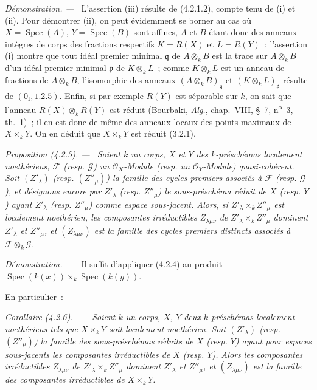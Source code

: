 \documentclass[10pt,oneside]{book}
\newenvironment{proposition}[1][]{%
  \par\medskip\noindent\itshape Proposition (#1). ---\ }{\par}
\newenvironment{corollary}[1][]{%
  \par\medskip\noindent\itshape Corollaire (#1). ---\ }{\par}
\newenvironment{proof}{%
  \par\medskip\noindent\textit{Démonstration. ---\ }}{\par}
\begin{document}
\begin{proof}
L'assertion (iii) résulte de (4.2.1.2), compte tenu de (i) et (ii). Pour
démontrer (ii), on peut évidemment se borner au cas où
$X=\operatorname{Spec}(A)$, $Y=\operatorname{Spec}(B)$ sont affines, $A$ et
$B$ étant donc des anneaux intègres de corps des fractions respectifs
$K=R(X)$ et $L=R(Y)$~; l'assertion (i) montre que tout idéal premier minimal
$\mathfrak q$ de $A\otimes_k B$ est la trace sur $A\otimes_k B$ d'un idéal
premier minimal $\mathfrak p$ de $K\otimes_k L$~; comme $K\otimes_k L$ est un
anneau de fractions de $A\otimes_k B$, l'isomorphie des anneaux
$(A\otimes_k B)_{\mathfrak q}$ et $(K\otimes_k L)_{\mathfrak p}$ résulte de
$(0_{\mathrm I},1.2.5)$. Enfin, si par exemple $R(Y)$ est séparable sur $k$,
on sait que l'anneau $R(X)\otimes_k R(Y)$ est réduit (Bourbaki,
\emph{Alg.}, chap.~VIII, \S~7, n\textsuperscript{o}~3, th.~1)~; il en est donc
de même des anneaux locaux des points maximaux de $X\times_k Y$. On en déduit
que $X\times_k Y$ est réduit (3.2.1).
\end{proof}

\begin{proposition}[4.2.5]
\label{IV.2.4.2.5-fr}
Soient $k$ un corps, $X$ et $Y$ des $k$-préschémas localement noethériens,
$\mathcal F$ (resp. $\mathcal G$) un $\mathcal O_X$-Module (resp. un
$\mathcal O_Y$-Module) quasi-cohérent. Soit $(Z'_\lambda)$ (resp.
$(Z''_\mu)$) la famille des cycles premiers associés à $\mathcal F$ (resp.
$\mathcal G$), et désignons encore par $Z'_\lambda$ (resp. $Z''_\mu$) le
sous-préschéma réduit de $X$ (resp. $Y$) ayant $Z'_\lambda$ (resp.
$Z''_\mu$) comme espace sous-jacent. Alors, si $Z'_\lambda\times_k Z''_\mu$
est localement noethérien, les composantes irréductibles $Z_{\lambda\mu\nu}$
de $Z'_\lambda\times_k Z''_\mu$ dominent $Z'_\lambda$ et $Z''_\mu$, et
$(Z_{\lambda\mu\nu})$ est la famille des cycles premiers distincts associés à
$\mathcal F\otimes_k\mathcal G$.
\end{proposition}

\begin{proof}
Il suffit d'appliquer (4.2.4) au produit
$\operatorname{Spec}(k(x))\times_k\operatorname{Spec}(k(y))$.
\end{proof}

En particulier~:

\begin{corollary}[4.2.6]
\label{IV.2.4.2.6-fr}
Soient $k$ un corps, $X$, $Y$ deux $k$-préschémas localement noethériens tels
que $X\times_k Y$ soit localement noethérien. Soit $(Z'_\lambda)$ (resp.
$(Z''_\mu)$) la famille des sous-préschémas réduits de $X$ (resp. $Y$) ayant
pour espaces sous-jacents les composantes irréductibles de $X$ (resp. $Y$).
Alors les composantes irréductibles $Z_{\lambda\mu\nu}$ de
$Z'_\lambda\times_k Z''_\mu$ dominent $Z'_\lambda$ et $Z''_\mu$, et
$(Z_{\lambda\mu\nu})$ est la famille des composantes irréductibles de
$X\times_k Y$.
\end{corollary}
\end{document}

